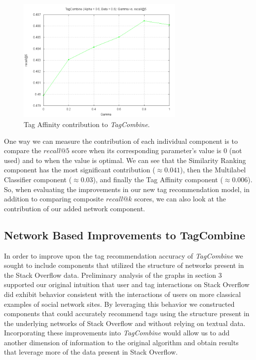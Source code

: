 \documentclass[11pt]{IEEEtran}
\begin{document}
\begin{figure}[h]
  \centering
    \includegraphics[width=3.2in]{tc_gamma.png}
  \caption{Tag Affinity contribution to \textit{TagCombine}.}
  \label{fig:tc_gamma}
\end{figure}

One way we can measure the contribution of each individual component is to compare the $recall@5$ score when its corresponding parameter’s value is $0$ (not used) and to when the value is optimal. We can see that the Similarity Ranking component has the most significant contribution ($\approx 0.041$), then the Multilabel Classifier component ($\approx 0.03$), and finally the Tag Affinity component ($\approx 0.006$). So, when evaluating the improvements in our new tag recommendation model, in addition to comparing composite $recall@k$ scores, we can also look at the contribution of our added network component.


\subsection{Network Based Improvements to TagCombine}

In order to improve upon the tag recommendation accuracy of \textit{TagCombine} we sought to include components that utilized the structure of networks present in the Stack Overflow data. Preliminary analysis of the graphs in section 3 supported our original intuition that user and tag interactions on Stack Overflow did exhibit behavior consistent with the interactions of users on more classical examples of social network sites. By leveraging this behavior we constructed components that could accurately recommend tags using the structure present in the underlying networks of Stack Overflow and without relying on textual data. Incorporating these improvements into \textit{TagCombine} would allow us to add another dimension of information to the original algorithm and obtain results that leverage more of the data present in Stack Overflow.
\end{document}
